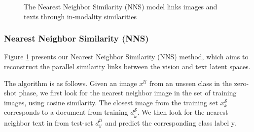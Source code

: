 \documentclass[11pt,a4paper]{article}
\newcommand\yuval[1]{\textcolor{darkpink}{\textbf{YUVAL:} #1 }}
\begin{document}
\begin{figure}[t]
\centering
{}
 \caption{The Nearest Neighbor Similarity (NNS) model links images and texts through in-modality similarities}
\label{fig:DS}
\end{figure}

\subsubsection{Nearest Neighbor Similarity (NNS)}

Figure \ref{fig:DS} presents our Nearest Neighbor Similarity (NNS) method, which aims to reconstruct the parallel similarity links between the vision and text latent spaces. 


The algorithm is as follows. Given an image $x^{\mathcal{U}}$ from an unseen class in the zero-shot phase,
we first look for the nearest neighbor image in the set of training images, using cosine similarity. The closest image from the training set $x^{\mathcal{S}}_k$ corresponds to a document from training $d^{\mathcal{S}}_{\hat{k}}$. We then look for the nearest neighbor text in from test-set $d^{\mathcal{U}}_y$ and predict the corresponding class label y.
 
\end{document}
